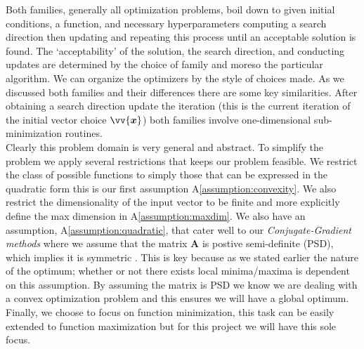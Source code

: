 \documentclass[12pt]{article}
\begin{document}
Both families, generally all optimization problems, boil down to given initial conditions, a function, and necessary hyperparameters computing a search direction then updating and repeating this process until an acceptable solution is found. The `acceptability' of the solution, the search direction, and conducting updates are determined by the choice of family and moreso the particular algorithm. We can organize the optimizers by the style of choices made. As we discussed both families and their differences there are some key similarities. After obtaining a search direction update the iteration (this is the current iteration of the initial vector choice $\vv{\bm{x}}$) both families involve one-dimensional sub-minimization routines. 
\\

Clearly this problem domain is very general and abstract. To simplify the problem we apply several restrictions that keeps our problem feasible. We restrict the class of possible functions to simply those that can be expressed in the quadratic form this is our first assumption A\ref{assumption:convexity}. We also restrict the dimensionality of the input vector to be finite and more explicitly define the max dimension in A\ref{assumption:maxdim}. We also have an assumption, A\ref{assumption:quadratic}, that cater well to our \textit{Conjugate-Gradient methods} where we assume that the matrix $\mathbf{A}$ is postive semi-definite (PSD), which implies it is symmetric \citep{Boyd2005ConvexO}. This is key because as we stated earlier the nature of the optimum; whether or not there exists local minima/maxima is dependent on this assumption. By assuming the matrix is PSD we know we are dealing with a convex optimization problem and this ensures we will have a global optimum. Finally, we choose to focus on function minimization, this task can be easily extended to function maximization but for this project we will have this sole focus.


\end{document}
